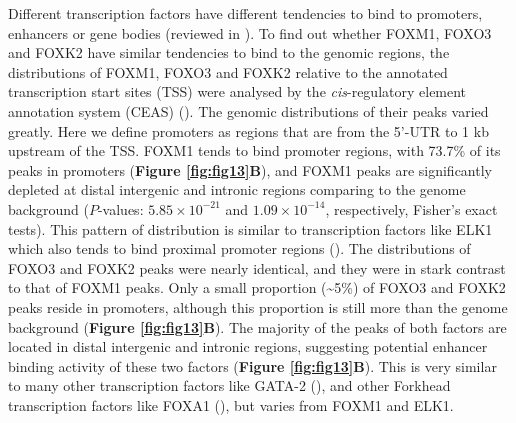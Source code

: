 Different transcription factors have different tendencies to bind to promoters, enhancers or gene bodies (reviewed in \cite{macquarrie2011genome-wide}). To find out whether FOXM1, FOXO3 and FOXK2 have similar tendencies to bind to the genomic regions, the distributions of FOXM1, FOXO3 and FOXK2 relative to the annotated transcription start sites (TSS) were analysed by the \textit{cis}-regulatory element annotation system (CEAS) (\cite{shin2009ceas:}). The genomic distributions of their peaks varied greatly. Here we define promoters as regions that are from the 5'-UTR to 1 kb upstream of the TSS. FOXM1 tends to bind promoter regions, with 73.7\% of its peaks in promoters (\textbf{Figure \ref{fig:fig13}B}), and FOXM1 peaks are significantly depleted at distal intergenic and intronic regions comparing to the genome background ($P$-values: $5.85 \times 10^{-21}$ and $1.09 \times 10^{-14}$, respectively, Fisher’s exact tests). This pattern of distribution is similar to transcription factors like ELK1 which also tends to bind proximal promoter regions (\cite{odrowaz2012elk1}). The distributions of FOXO3 and FOXK2 peaks were nearly identical, and they were in stark contrast to that of FOXM1 peaks. Only a small proportion (\textasciitilde 5\%) of FOXO3 and FOXK2 peaks reside in promoters, although this proportion is still more than the genome background (\textbf{Figure \ref{fig:fig13}B}). The majority of the peaks of both factors are located in distal intergenic and intronic regions, suggesting potential enhancer binding activity of these two factors (\textbf{Figure \ref{fig:fig13}B}). This is very similar to many other transcription factors like GATA-2 (\cite{linnemann2011genetic}), and other Forkhead transcription factors like FOXA1 (\cite{hurtado2011foxa1}), but varies from FOXM1 and ELK1.

